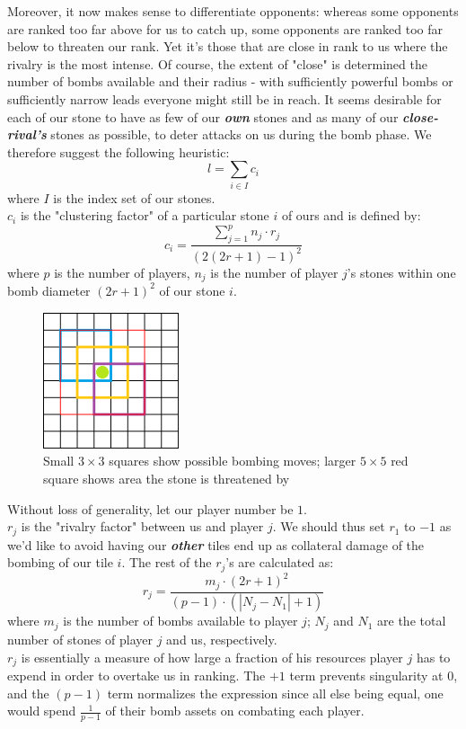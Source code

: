 Moreover, it now makes sense to differentiate opponents: whereas some opponents are ranked too far above for us to catch up, some opponents are ranked too far below to threaten our rank. Yet it's those that are close in rank to us where the rivalry is the most intense. Of course, the extent of "close" is determined the number of bombs available and their radius - with sufficiently powerful bombs or sufficiently narrow leads everyone might still be in reach. It seems desirable for each of our stone to have as few of our \textbf{\textit{own}} stones and as many of our \textbf{\textit{close-rival's}} stones as possible, to deter attacks on us during the bomb phase. We therefore suggest the following heuristic: \\
\[ l = \sum\limits_{i \in I} c_i \]
where $I$ is the index set of our stones. 
\\
$c_i$ is the "clustering factor" of a particular stone $i$ of ours and is defined by: \\
\[c_i = \frac{\sum\limits_{j=1}^p n_j \cdot r_j}{(2(2r+1)-1)^2}\]
where $p$ is the number of players, $n_j$ is the number of player $j$'s stones within one bomb diameter $(2r+1)^2$ of our stone $i$. \\


\begin{figure}[H]
    \centering
    \includegraphics[height=4cm]{pictures/assignment1/Bombing.png}
    \caption{Small $3 \times 3$ squares show possible bombing moves; larger $5 \times 5$ red square shows area the stone is threatened by}
    \label{fig:Bombing Diameter}
\end{figure}

Without loss of generality, let our player number be $1$. \\
$r_j$ is the "rivalry factor" between us and player $j$. We should thus set $r_1$ to $-1$ as we'd like to avoid having our \textbf{\textit{other}} tiles end up as collateral damage of the bombing of our tile $i$. The rest of the $r_j$'s are calculated as: \\
\[r_j = \frac{m_j \cdot (2r+1)^2}{(p-1) \cdot (|N_j - N_1| + 1)} \]
where $m_j$ is the number of bombs available to player $j$; $N_j$ and $N_1$ are the total number of stones of player $j$ and us, respectively. \\
$r_j$ is essentially a measure of how large a fraction of his resources player $j$ has to expend in order to overtake us in ranking. The $+1$ term prevents singularity at $0$, and the $(p-1)$ term normalizes the expression since all else being equal, one would spend $\frac{1}{p-1}$ of their bomb assets on combating each player.



